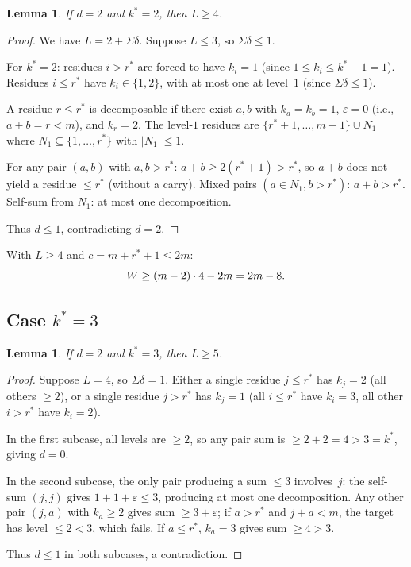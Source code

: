 \documentclass[11pt]{amsart}
\newtheorem{lemma}[theorem]{Lemma}
\theoremstyle{definition}
\theoremstyle{remark}
\begin{document}
\begin{lemma}\label{lem:B-k2}
If $d = 2$ and $k^* = 2$, then $L \ge 4$.
\end{lemma}

\begin{proof}
We have $L = 2 + \Sigma\delta$.  Suppose $L \le 3$, so $\Sigma\delta \le 1$.

For $k^* = 2$: residues $i > r^*$ are forced to have $k_i = 1$ (since
$1 \le k_i \le k^* - 1 = 1$).  Residues $i \le r^*$ have $k_i \in \{1, 2\}$,
with at most one at level~$1$ (since $\Sigma\delta \le 1$).

A residue $r \le r^*$ is decomposable if there exist $a, b$ with $k_a = k_b = 1$,
$\varepsilon = 0$ (i.e., $a + b = r < m$), and $k_r = 2$.
The level-$1$ residues are $\{r^* + 1, \ldots, m - 1\} \cup N_1$
where $N_1 \subseteq \{1, \ldots, r^*\}$ with $|N_1| \le 1$.

For any pair $(a, b)$ with $a, b > r^*$: $a + b \ge 2(r^* + 1) > r^*$,
so $a + b$ does not yield a residue $\le r^*$ (without a carry).
Mixed pairs $(a \in N_1, b > r^*)$: $a + b > r^*$.
Self-sum from $N_1$: at most one decomposition.

Thus $d \le 1$, contradicting $d = 2$.
\end{proof}

With $L \ge 4$ and $c = m + r^* + 1 \le 2m$:
\[
  W \ge (m - 2) \cdot 4 - 2m = 2m - 8. \qedhere
\]

\subsection{Case $k^* = 3$}

\begin{lemma}\label{lem:B-k3-L}
If $d = 2$ and $k^* = 3$, then $L \ge 5$.
\end{lemma}

\begin{proof}
Suppose $L = 4$, so $\Sigma\delta = 1$.
Either a single residue $j \le r^*$ has $k_j = 2$ (all others $\ge 2$),
or a single residue $j > r^*$ has $k_j = 1$ (all $i \le r^*$ have $k_i = 3$,
all other $i > r^*$ have $k_i = 2$).

In the first subcase, all levels are $\ge 2$, so any pair sum is
$\ge 2 + 2 = 4 > 3 = k^*$, giving $d = 0$.

In the second subcase, the only pair producing a sum $\le 3$ involves~$j$:
the self-sum $(j, j)$ gives $1 + 1 + \varepsilon \le 3$, producing at most
one decomposition.
Any other pair $(j, a)$ with $k_a \ge 2$ gives sum $\ge 3 + \varepsilon$;
if $a > r^*$ and $j + a < m$, the target has level $\le 2 < 3$, which fails.
If $a \le r^*$, $k_a = 3$ gives sum $\ge 4 > 3$.

Thus $d \le 1$ in both subcases, a contradiction.
\end{proof}
\end{document}
